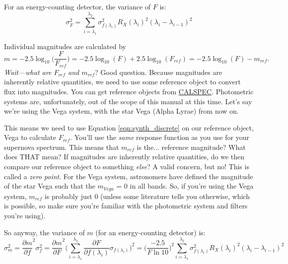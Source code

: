 For an energy-counting detector, the variance of $F$ is:
\begin{equation}
    \sigma_{F}^{2} = \sum_{i=\lambda_{1}}^{\lambda_{2}} \sigma_{f(\lambda_{i})}^{2} R_{X}(\lambda_{i})^{2}(\lambda_{i} - \lambda_{i-1})^{2}
\end{equation}

Individual magnitudes are calculated by
\begin{equation}
    m = -2.5\log_{10}\Big(\frac{F}{F_{ref}}\Big) = -2.5\log_{10}(F) + 2.5\log_{10}(F_{ref}) = -2.5\log_{10}(F) - m_{ref}.
\end{equation}
\textit{Wait---what are $F_{ref}$ and $m_{ref}$}? Good question. Because magnitudes are inherently relative quantities, we need to use some reference object to convert flux into magnitudes. You can get reference objects from \href{https://www.stsci.edu/hst/instrumentation/reference-data-for-calibration-and-tools/astronomical-catalogs/calspec}{CALSPEC}. Photometric systems are, unfortunately, out of the scope of this manual at this time. Let's say we're using the Vega system, with the star Vega (Alpha Lyrae) from now on. 

This means we need to use Equation \ref{eqn:synth_discrete} on our reference object, Vega to calculate $F_{ref}$. You'll use the \textit{same} response function as you use for your supernova spectrum. This means that $m_{ref}$ is the... reference magnitude? What does THAT mean? If magnitudes are inherently relative quantities, do we then compare our reference object to something \textit{else}? A valid concern, but no! This is called a \textit{zero point}. For the Vega system, astronomers have defined the magnitude of the star Vega such that the $m_{Vega}$ = 0 in all bands. So, if you're using the Vega system, $m_{ref}$ is probably just 0 (unless some literature tells you otherwise, which is possible, so make sure you're familiar with the photometric system and filters you're using).

So anyway, the variance of $m$ (for an energy-counting detector) is:
\begin{equation}
    \sigma_{m}^{2} = \frac{\partial m}{\partial f}^{2} \sigma_{f}^{2} = \frac{\partial m}{\partial F}^{2} \Big( \sum_{i=\lambda_{1}}^{\lambda_{2}} \frac{\partial F}{\partial f(\lambda_{i})} \sigma_{f(\lambda_{i})}\Big)^{2} = \Big( \frac{-2.5}{F\ln10} \Big)^{2} \sum_{i=\lambda_{1}}^{\lambda_{2}}\sigma_{f(\lambda_{i})}^{2} R_{X}(\lambda_{i})^{2}(\lambda_{i}-\lambda_{i-1})^{2}
    \label{eqn:m_err}
\end{equation}

